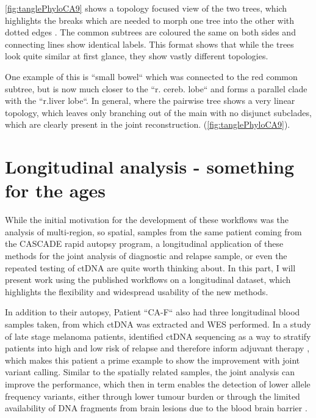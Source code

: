 \autoref{fig:tanglePhyloCA9} shows a topology focused view of the two trees, which highlights the breaks which are needed to morph one tree into the other with dotted edges \cite{Vienne2018}. The common subtrees are coloured the same on both sides and connecting lines show identical labels. This format shows that while the trees look quite similar at first glance, they show vastly different topologies.


One example of this is ``small bowel`` which was connected to the red common subtree, but is now much closer to the ``r. cereb. lobe`` and forms a parallel clade with the ``r.liver lobe``. In general, where the pairwise tree shows a very linear topology, which leaves only branching out of the main with no disjunct subclades, which are clearly present in the joint reconstruction.  (\autoref{fig:tanglePhyloCA9}).


\section[Longitudinal analysis]{Longitudinal analysis - something for the ages }
\label{variantcalling-sec:longitudinal}

While the initial motivation for the development of these workflows was the analysis of multi-region, so spatial, samples from the same patient coming from the CASCADE rapid autopsy program, a longitudinal application of these methods for the joint analysis of diagnostic and relapse sample, or even the repeated testing of ctDNA are quite worth thinking about. In this part, I will present work using the published workflows on a longitudinal dataset, which highlights the flexibility and widespread usability of the new methods.

In addition to their autopsy, Patient ``CA-F`` also had three longitudinal blood samples taken, from which ctDNA was extracted and WES performed. In a study of late stage melanoma patients,  identified ctDNA sequencing as a way to stratify patients into high and low risk of relapse and therefore inform adjuvant therapy \cite{Tan2019}, which makes this patient a prime example to show the improvement with joint variant calling. Similar to the spatially related samples, the joint analysis can improve the performance, which then in term enables the detection of lower allele frequency variants, either through lower tumour burden or through the limited availability of DNA fragments from brain lesions due to the blood brain barrier \cite{2014}.

